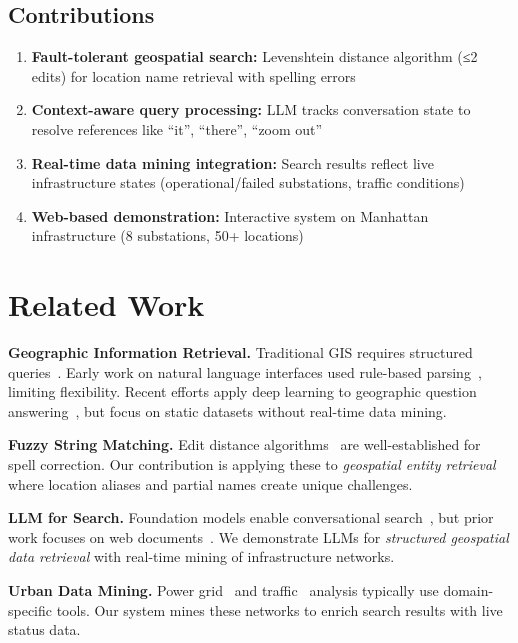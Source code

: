 \documentclass[sigconf]{acmart}
\begin{document}
\subsection{Contributions}

\begin{enumerate}
    \item \textbf{Fault-tolerant geospatial search:} Levenshtein distance algorithm (≤2 edits) for location name retrieval with spelling errors
    \item \textbf{Context-aware query processing:} LLM tracks conversation state to resolve references like ``it'', ``there'', ``zoom out''
    \item \textbf{Real-time data mining integration:} Search results reflect live infrastructure states (operational/failed substations, traffic conditions)
    \item \textbf{Web-based demonstration:} Interactive system on Manhattan infrastructure (8 substations, 50+ locations)
\end{enumerate}

\section{Related Work}

\textbf{Geographic Information Retrieval.} Traditional GIS requires structured queries~\cite{longley2005geographic}. Early work on natural language interfaces used rule-based parsing~\cite{popescu2003natural}, limiting flexibility. Recent efforts apply deep learning to geographic question answering~\cite{roberts2023gpt,gao2021geographic}, but focus on static datasets without real-time data mining.

\textbf{Fuzzy String Matching.} Edit distance algorithms~\cite{navarro2001guided} are well-established for spell correction. Our contribution is applying these to \textit{geospatial entity retrieval} where location aliases and partial names create unique challenges.

\textbf{LLM for Search.} Foundation models enable conversational search~\cite{zhou2023comprehensive}, but prior work focuses on web documents~\cite{anelli2023llm}. We demonstrate LLMs for \textit{structured geospatial data retrieval} with real-time mining of infrastructure networks.

\textbf{Urban Data Mining.} Power grid~\cite{pypsa2018} and traffic~\cite{lopez2018} analysis typically use domain-specific tools. Our system mines these networks to enrich search results with live status data.
\end{document}
